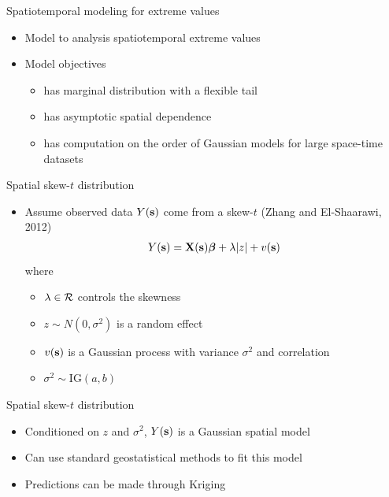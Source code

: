 \documentclass{beamer}
\begin{document}
\begin{frame}{Spatiotemporal modeling for extreme values}
  \begin{itemize} \setlength{\itemsep}{0.5em}
    \item Model to analysis spatiotemporal extreme values
    \item Model objectives
    \begin{itemize}
      \item has marginal distribution with a flexible tail
      \item has asymptotic spatial dependence
      \item has computation on the order of Gaussian models for large space-time datasets
    \end{itemize}
  \end{itemize}
\end{frame}

\begin{frame}{Spatial skew-$t$ distribution}
  \begin{itemize} \setlength{\itemsep}{0.5em}
    \item Assume observed data $Y(\mbox{\bf s})$ come from a skew-$t$ (Zhang and El-Shaarawi, 2012)
    \begin{align*}
      Y(\mbox{\bf s}) = \mbox{\bf X}(\mbox{\bf s})\mbox{\boldmath $\beta$} + \lambda |z| + v(\mbox{\bf s})
    \end{align*}
    where
    \begin{itemize} \setlength{\itemsep}{0.25em}
      \item $\lambda \in {\cal R}$ controls the skewness
      \item $z \sim N(0, \sigma^2)$ is a random effect
      \item $v(\mbox{\bf s})$ is a Gaussian process with variance $\sigma^2$ and \Matern correlation
      \item $\sigma^2 \sim \text{IG}(a, b)$
    \end{itemize}
  \end{itemize}
\end{frame}

\begin{frame}{Spatial skew-$t$ distribution}
  \begin{itemize} \setlength{\itemsep}{0.5em}
   \item \alert{Conditioned} on $z$ and $\sigma^2$, $Y(\mbox{\bf s})$ is a Gaussian spatial model
    \item Can use standard geostatistical methods to fit this model
    \item Predictions can be made through Kriging
  \end{itemize}
\end{frame}
\end{document}
